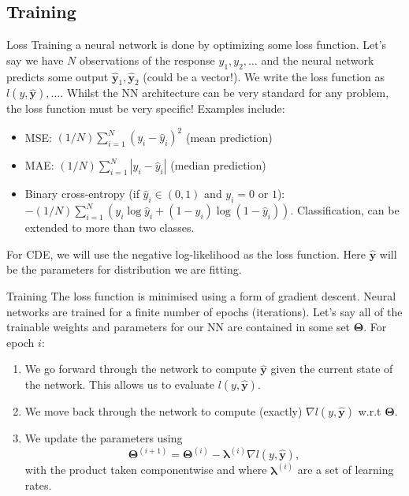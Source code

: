 \documentclass{beamer}
\begin{document}
\subsection{Training}
\begin{frame}{Loss}
Training a neural network is done by optimizing some loss function. Let's say we have $N$ observations of the response $y_1,y_2,\dots$ and the neural network predicts some output $\hat{\mathbf{y}}_1,\hat{\mathbf{y}}_2$ (could be a vector!). We write the loss function as $l(y,\hat{\mathbf{y}}),\dots$. Whilst the NN architecture can be very standard for any problem, the loss function must be very specific! Examples include:
\begin{itemize}
\item MSE: $(1/N)\sum^N_{i=1}(y_i-\hat{y}_i)^2$ (mean prediction)
\item MAE: $(1/N)\sum^N_{i=1}|y_i-\hat{y}_i|$ (median prediction)
\item Binary cross-entropy (if $\hat{y}_i\in(0,1)$ and $y_i=0$ or $1$): $-(1/N)\sum^N_{i=1}(y_i\log\hat{y}_i+(1-y_i)\log(1-\hat{y}_i))$. Classification, can be extended to more than two classes.
\end{itemize}
For CDE, we will use the negative log-likelihood as the loss function. Here $\hat{\mathbf{y}}$ will be the parameters for distribution we are fitting.
\end{frame}
\begin{frame}{Training}
The loss function is minimised using a form of gradient descent. Neural networks are trained for a finite number of epochs (iterations). Let's say all of the trainable weights and parameters for our NN are contained in some set $\boldsymbol{\Theta}$.   For epoch $i$:
\begin{enumerate}
\item We go forward through the network to compute $\hat{\mathbf{y}}$ given the current state of the network. This allows us to evaluate $l(y,\hat{\mathbf{y}})$.
\item We move back through the network to compute (exactly) $\nabla l(y,\hat{\mathbf{y}})$ w.r.t $\boldsymbol{\Theta}$.
\item We update the parameters using
\[
\boldsymbol{\Theta}^{(i+1)}=\boldsymbol{\Theta}^{(i)}-\boldsymbol{\lambda}^{(i)}\nabla l(y,\hat{\mathbf{y}}),
\] 
with the product taken componentwise and where $\boldsymbol{\lambda}^{(i)}$ are a set of learning rates.
\end{enumerate} 
\end{frame}
\end{document}
